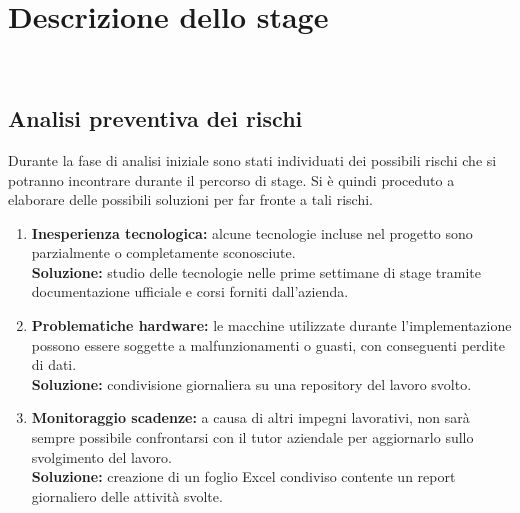 
\chapter{Descrizione dello stage}
\label{cap:descrizione-stage}

\\


\section{Analisi preventiva dei rischi}

Durante la fase di analisi iniziale sono stati individuati dei possibili rischi che si potranno incontrare durante il percorso di stage. Si è quindi proceduto a elaborare delle possibili soluzioni per far fronte a tali rischi.

\begin{enumerate}
    \item \textbf{Inesperienza tecnologica:} alcune tecnologie incluse nel progetto sono parzialmente o completamente sconosciute.\\
    \textbf{Soluzione:} studio delle tecnologie nelle prime settimane di stage tramite documentazione ufficiale e corsi forniti dall'azienda.
    \item \textbf{Problematiche hardware:} le macchine utilizzate durante l'implementazione possono essere soggette a malfunzionamenti o guasti, con conseguenti perdite di dati.\\
    \textbf{Soluzione:} condivisione giornaliera su una repository del lavoro svolto.
    \item \textbf{Monitoraggio scadenze:} a causa di altri impegni lavorativi, non sarà sempre possibile confrontarsi con il tutor aziendale per aggiornarlo sullo svolgimento del lavoro.\\
    \textbf{Soluzione:} creazione di un foglio Excel condiviso contente un report giornaliero delle attività svolte.
\end{enumerate}

